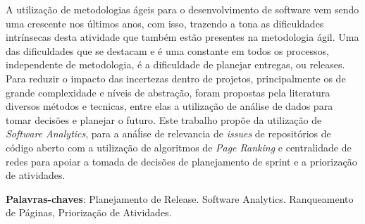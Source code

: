 \begin{resumo}
 A utilização de metodologias ágeis para o desenvolvimento de software vem sendo
 uma crescente nos últimos anos, com isso, trazendo a tona as dificuldades intrínsecas 
 desta atividade que também estão presentes na metodologia ágil. Uma das
 dificuldades que se destacam e é uma constante em todos os processos, independente
 de metodologia, é a dificuldade de planejar entregas, ou releases. Para reduzir o
 impacto das incertezas dentro de projetos, principalmente os de grande complexidade
 e níveis de abstração, foram propostas pela literatura diversos métodos e tecnicas,
 entre elas a utilização de análise de dados para tomar decisões e planejar o futuro.
 Este trabalho propõe da utilização de \textit{Software Analytics}, para a anáĺise de
 relevancia de \textit{issues} de repositórios de código aberto com a utilização de
 algoritmos de \textit{Page Ranking} e centralidade de redes para apoiar a tomada
 de decisões de planejamento de sprint e a priorização de atividades.
 \vspace{\onelineskip}
    
 \noindent
 \textbf{Palavras-chaves}: Planejamento de Release. Software Analytics. Ranqueamento de Páginas, Priorização de Atividades.
\end{resumo}
